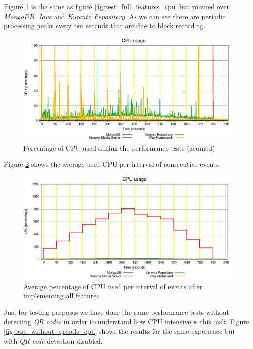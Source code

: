 Figure \ref{fig:test_full_features_cpu_zoom} is the same as figure \ref{fig:test_full_features_cpu} but zoomed over \emph{MongoDB}, \emph{Java} and \emph{Kurento Repository}. As we can see there are periodic processing peaks every ten seconds that are due to block recording. 

\begin{figure}[!htb]
  \centering
  \includegraphics[width=\textwidth]{stats/test_full_features_cpu_zoom.eps}
  \caption{Percentage of CPU used during the performance tests (zoomed)}
  \label{fig:test_full_features_cpu_zoom}
\end{figure}


   Figure \ref{fig:summary_full_cpu} shows the average used \ac{CPU} per interval of consecutive events. 

\begin{figure}[!htb]
  \centering
  \includegraphics[width=\textwidth]{stats/summary_full_cpu.eps}
  \caption{Average percentage of CPU used per interval of events after implementing all features}
  \label{fig:summary_full_cpu}
\end{figure}



  Just for testing purposes we have done the same performance tests without detecting \emph{QR codes} in order to understand how \ac{CPU} intensive is this task. Figure \ref{fig:test_without_qrcode_cpu} shows the results for the same experience but with \emph{QR code} detection disabled.

